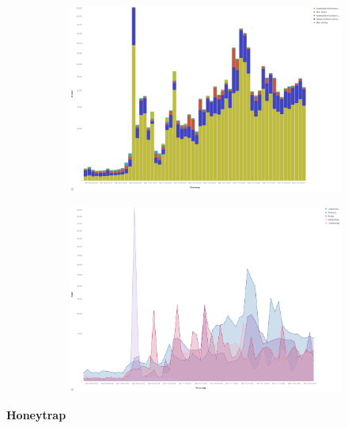 \begin{figure}
    \centering

    \begin{subfigure}[b]{0.49\textwidth}
        \centering
        \includegraphics[width=\textwidth]{figures/tpot-suricata-attacks.png}
        \caption{}
        \label{fig:tpot-suricata-attacks}
    \end{subfigure}
    \hfill
    \begin{subfigure}[b]{0.49\textwidth}
        \centering
        \includegraphics[width=\textwidth]{figures/tpot-suricata-country.png}
        \caption{}
        \label{fig:tpot-suricata-country}
    \end{subfigure}
    \caption[]{}
    \label{fig:suricata-results}
\end{figure}

\textbf{Honeytrap}

